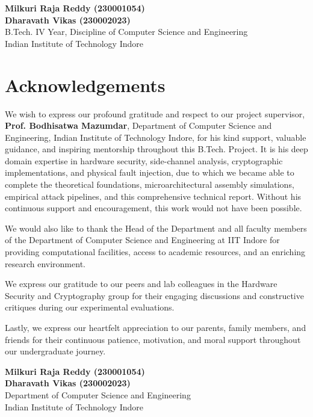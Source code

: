 \documentclass[12pt,a4paper,oneside]{report}
\begin{document}
\vspace{1.5cm}
\noindent
\textbf{Milkuri Raja Reddy (230001054)} \\
\textbf{Dharavath Vikas (230002023)} \\
B.Tech. IV Year, Discipline of Computer Science and Engineering \\
Indian Institute of Technology Indore

\cleardoublepage

\chapter*{Acknowledgements}

We wish to express our profound gratitude and respect to our project supervisor, \textbf{Prof. Bodhisatwa Mazumdar}, Department of Computer Science and Engineering, Indian Institute of Technology Indore, for his kind support, valuable guidance, and inspiring mentorship throughout this B.Tech. Project. It is his deep domain expertise in hardware security, side-channel analysis, cryptographic implementations, and physical fault injection, due to which we became able to complete the theoretical foundations, microarchitectural assembly simulations, empirical attack pipelines, and this comprehensive technical report. Without his continuous support and encouragement, this work would not have been possible.

We would also like to thank the Head of the Department and all faculty members of the Department of Computer Science and Engineering at IIT Indore for providing computational facilities, access to academic resources, and an enriching research environment.

We express our gratitude to our peers and lab colleagues in the Hardware Security and Cryptography group for their engaging discussions and constructive critiques during our experimental evaluations.

Lastly, we express our heartfelt appreciation to our parents, family members, and friends for their continuous patience, motivation, and moral support throughout our undergraduate journey.

\vspace{1.5cm}
\noindent
\textbf{Milkuri Raja Reddy (230001054)} \\
\textbf{Dharavath Vikas (230002023)} \\
Department of Computer Science and Engineering \\
Indian Institute of Technology Indore
\end{document}
